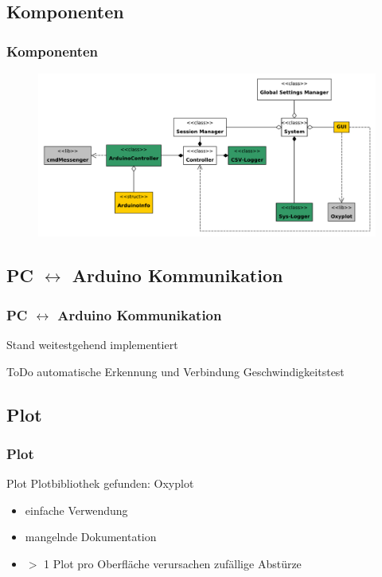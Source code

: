 \documentclass{beamer}
\begin{document}
\begin{frame}
 \section{Komponenten}
 \frametitle{Komponenten}
\begin{figure}
 \centering
 \includegraphics[width=\textwidth]{./pics/StrukturUML.pdf}
\end{figure}

\end{frame}

\begin{frame}
 \section{PC $\leftrightarrow$ Arduino Kommunikation}
 \frametitle{PC $\leftrightarrow$ Arduino Kommunikation}
 \begin{block}{Stand}
  weitestgehend implementiert
 \end{block}
 \begin{block}{ToDo}
  automatische Erkennung und Verbindung
  Geschwindigkeitstest
 \end{block}
\end{frame}

\begin{frame}
 \section{Plot}
 \frametitle{Plot}
 \begin{block}{Plot}
  Plotbibliothek gefunden: Oxyplot
  \begin{itemize}
  \item einfache Verwendung
  \item mangelnde Dokumentation
  \item $>$ 1 Plot pro Oberfläche verursachen zufällige Abstürze
 \end{itemize}
 \end{block}
\end{frame}
\end{document}
